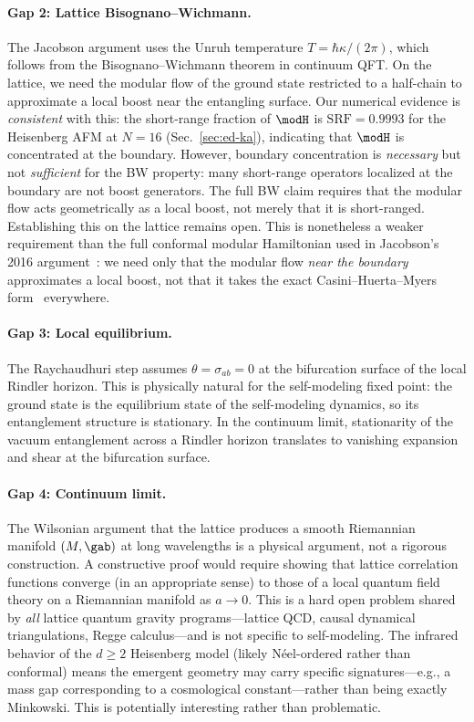 \paragraph{Gap 2: Lattice Bisognano--Wichmann.}
The Jacobson argument uses the Unruh temperature $T = \hbar\kappa/(2\pi)$,
which follows from the Bisognano--Wichmann theorem in continuum QFT.  On
the lattice, we need the modular flow of the ground state restricted to a
half-chain to approximate a local boost near the entangling surface.
Our numerical evidence is \emph{consistent} with this: the short-range
fraction of $\modH$ is $\mathrm{SRF} = 0.9993$ for the Heisenberg AFM
at $N = 16$ (Sec.~\ref{sec:ed-ka}), indicating that $\modH$ is
concentrated at the boundary.  However, boundary concentration is
\emph{necessary} but not \emph{sufficient} for the BW property: many
short-range operators localized at the boundary are not boost generators.
The full BW claim requires that the modular flow acts geometrically as a
local boost, not merely that it is short-ranged.  Establishing this on
the lattice remains open.  This is nonetheless a weaker requirement than
the full conformal modular Hamiltonian used in Jacobson's 2016
argument~\cite{Jacobson2016}: we need only that the modular flow
\emph{near the boundary} approximates a local boost, not that it takes
the exact Casini--Huerta--Myers form~\cite{CasiniHuertaMyers2011}
everywhere.

\paragraph{Gap 3: Local equilibrium.}
The Raychaudhuri step assumes $\theta = \sigma_{ab} = 0$ at the
bifurcation surface of the local Rindler horizon.  This is physically
natural for the self-modeling fixed point: the ground state is the
equilibrium state of the self-modeling dynamics, so its entanglement
structure is stationary.  In the continuum limit, stationarity of the
vacuum entanglement across a Rindler horizon translates to vanishing
expansion and shear at the bifurcation surface.

\paragraph{Gap 4: Continuum limit.}
The Wilsonian argument that the lattice produces a smooth Riemannian
manifold $(M, \gab)$ at long wavelengths is a physical argument, not a
rigorous construction.  A constructive proof would require showing that
lattice correlation functions converge (in an appropriate sense) to those
of a local quantum field theory on a Riemannian manifold as $a \to 0$.
This is a hard open problem shared by \emph{all} lattice quantum gravity
programs---lattice QCD, causal dynamical triangulations, Regge
calculus---and is not specific to self-modeling.  The infrared behavior
of the $d \geq 2$ Heisenberg model (likely N\'eel-ordered rather than
conformal) means the emergent geometry may carry specific
signatures---e.g., a mass gap corresponding to a cosmological
constant---rather than being exactly Minkowski.  This is potentially
interesting rather than problematic.

